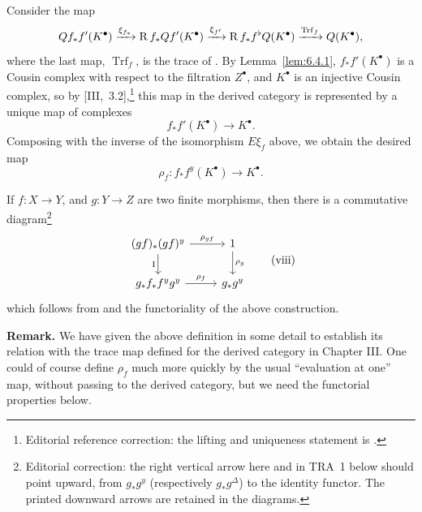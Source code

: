 Consider the map
\[
Qf_{*}f'(K^{\bullet}) \xrightarrow{\xi_{f_{*}}} \operatorname{R} f_{*}Qf'(K^{\bullet}) \xrightarrow{\xi_{f'}} \operatorname{R} f_{*}f^{\flat}Q(K^{\bullet}) \xrightarrow{\operatorname{Trf}_{f}} Q(K^{\bullet}),
\]
where the last map, $\operatorname{Trf}_f$, is the trace of . By Lemma~\ref{lem:6.4.1}, $f_*f'(K^\bullet)$ is a Cousin complex with respect to the filtration $Z^\bullet$, and $K^\bullet$ is an injective Cousin complex, so by [III,~3.2],\footnote{Editorial reference correction: the lifting and uniqueness statement is .} this map in the derived category is represented by a unique map of complexes
\[
f_*f'(K^\bullet) \longrightarrow K^\bullet.
\]
Composing with the inverse of the isomorphism $E\xi_f$ above, we obtain the desired map
\[
\rho_{f}\colon f_{*}f^{y}(K^{\bullet}) \longrightarrow K^{\bullet}.
\]

If $f\colon X\to Y$, and $g\colon Y\to Z$ are two finite morphisms, then there is a commutative diagram\footnote{Editorial correction: the right vertical arrow here and in TRA~1 below should point upward, from $g_*g^y$ (respectively $g_*g^\Delta$) to the identity functor. The printed downward arrows are retained in the diagrams.}
\[
\begin{tikzcd}
(gf)_*(gf)^{y} \ar[r,"\rho_{gf}"] \ar[d,"\mathrm{I}"'] & 1 \ar[d,"\rho_g"] \\
g_*f_* f^{y}g^{y} \ar[r,"\rho_f"] & g_*g^{y}
\end{tikzcd}
\tag{viii}\label{eq:6.4.viii}
\]
which follows from  and the functoriality of the above construction.

\par\medskip\noindent\textbf{Remark.}
We have given the above definition in some detail to establish its relation with the trace map defined for the derived category in Chapter III. One could of course define $\rho_f$ much more quickly by the usual ``evaluation at one'' map, without passing to the derived category, but we need the functorial properties below.
\par\medskip

